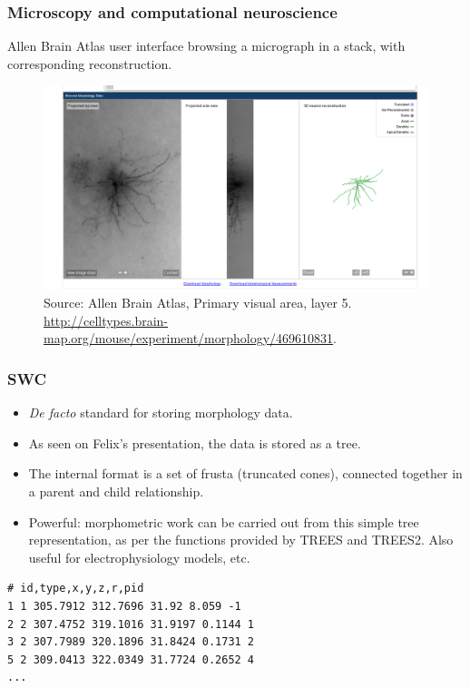 \documentclass{beamer}
\begin{document}
\begin{frame}
\frametitle{Microscopy and computational neuroscience}

Allen Brain Atlas user interface browsing a micrograph in a stack,
with corresponding reconstruction.

\begin{figure}[H]
    \centering
    \includegraphics[scale=0.2]{../blog/images/allen_brain_atlas_primary_visual.png}
    \caption{Source: Allen Brain Atlas, Primary visual area, layer 5.
      \url{http://celltypes.brain-map.org/mouse/experiment/morphology/469610831}.}
    \label{fig:3d_stack}
\end{figure}

\end{frame}

\begin{frame}[fragile]
\frametitle{SWC}

\begin{itemize}

\item \emph{De facto} standard for storing morphology data.
\pause
\item As seen on Felix's presentation, the data is stored as a tree.
\pause
\item The internal format is a set of frusta (truncated cones),
  connected together in a parent and child relationship.
\pause
\item Powerful: morphometric work can be carried out from this simple
  tree representation, as per the functions provided by TREES and
  TREES2. Also useful for electrophysiology models, etc.
\pause
\end{itemize}

\begin{verbatim}
# id,type,x,y,z,r,pid
1 1 305.7912 312.7696 31.92 8.059 -1
2 2 307.4752 319.1016 31.9197 0.1144 1
3 2 307.7989 320.1896 31.8424 0.1731 2
5 2 309.0413 322.0349 31.7724 0.2652 4
...
\end{verbatim}
\end{frame}
\end{document}
